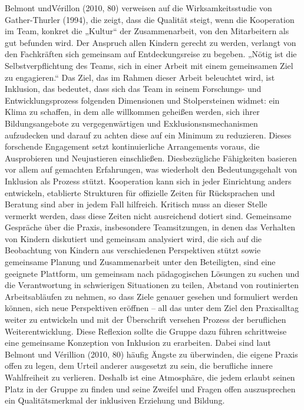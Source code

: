 Belmont undVérillon (2010, 80) verweisen auf die Wirksamkeitsstudie von Gather-Thurler (1994), die zeigt, dass die Qualität steigt, wenn die Kooperation im Team, konkret die „Kultur“ der Zusammenarbeit, von den Mitarbeitern als gut befunden wird.  
Der Anspruch allen Kindern gerecht zu werden, verlangt von den Fachkräften sich gemeinsam auf Entdeckungsreise zu begeben. „Nötig ist die Selbstverpflichtung des Teams, sich in einer Arbeit mit einem gemeinsamen Ziel zu engagieren.“ Das Ziel, das im Rahmen dieser Arbeit beleuchtet wird, ist Inklusion, das bedeutet, dass sich das Team in seinem Forschungs- und Entwicklungsprozess folgenden Dimensionen und Stolpersteinen widmet: 
ein Klima zu schaffen, in dem alle willkommen geheißen werden, sich ihrer Bildungsangebote zu vergegenwärtigen und Exklusionsnsmechanismen aufzudecken und darauf zu achten diese auf ein Minimum zu reduzieren.
Dieses forschende Engagement setzt kontinuierliche Arrangements voraus, die Ausprobieren und Neujustieren einschließen. Diesbezügliche Fähigkeiten basieren vor allem auf gemachten Erfahrungen, was wiederholt den Bedeutungsgehalt von Inklusion als Prozess stützt. 
Kooperation kann sich in jeder Einrichtung anders entwickeln, etablierte Strukturen für offizielle Zeiten für Rücksprachen und Beratung sind aber in jedem Fall hilfreich. Kritisch muss an dieser Stelle vermerkt werden, dass diese Zeiten nicht ausreichend dotiert sind.
Gemeinsame Gespräche über die Praxis, insbesondere Teamsitzungen, in denen das Verhalten von Kindern diskutiert und gemeinsam analysiert wird, die sich auf die Beobachtung von Kindern aus verschiedenen Perspektiven stützt sowie gemeinsame Planung und Zusammenarbeit unter den Beteiligten, sind eine geeignete Plattform, um gemeinsam nach pädagogischen Lösungen zu suchen und die Verantwortung in schwierigen Situationen zu teilen, Abstand von routinierten Arbeitsabläufen zu nehmen, so dass Ziele genauer gesehen und formuliert werden können, sich neue Perspektiven eröffnen – all das unter dem Ziel den Praxisalltag weiter zu entwickeln und mit der Überschrift versehen Prozess der beruflichen Weiterentwicklung.
Diese Reflexion sollte die Gruppe dazu führen schrittweise eine gemeinsame Konzeption von Inklusion zu erarbeiten.
Dabei sind laut Belmont und Vérillion (2010, 80) häufig Ängste zu überwinden, die eigene Praxis offen zu legen, dem Urteil anderer ausgesetzt zu sein, die berufliche innere Wahlfreiheit zu verlieren. Deshalb ist eine Atmosphäre, die jedem erlaubt seinen Platz in der Gruppe zu finden und seine Zweifel und Fragen offen auszusprechen ein Qualitätsmerkmal der inklusiven Erziehung und Bildung.

